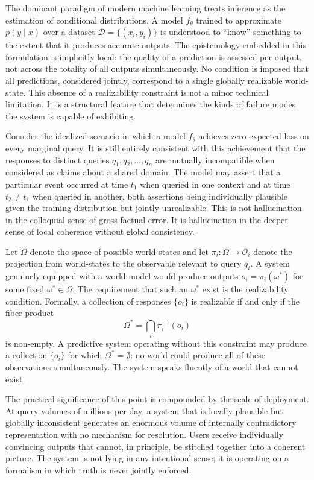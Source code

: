 \documentclass[12pt, oneside]{article}
\begin{document}
The dominant paradigm of modern machine learning treats inference as the estimation of conditional distributions. A model $f_\theta$ trained to approximate $p(y \mid x)$ over a dataset $\mathcal{D} = \{(x_i, y_i)\}$ is understood to ``know'' something to the extent that it produces accurate outputs. The epistemology embedded in this formulation is implicitly local: the quality of a prediction is assessed per output, not across the totality of all outputs simultaneously. No condition is imposed that all predictions, considered jointly, correspond to a single globally realizable world-state. This absence of a realizability constraint is not a minor technical limitation. It is a structural feature that determines the kinds of failure modes the system is capable of exhibiting.

Consider the idealized scenario in which a model $f_\theta$ achieves zero expected loss on every marginal query. It is still entirely consistent with this achievement that the responses to distinct queries $q_1, q_2, \ldots, q_n$ are mutually incompatible when considered as claims about a shared domain. The model may assert that a particular event occurred at time $t_1$ when queried in one context and at time $t_2 \neq t_1$ when queried in another, both assertions being individually plausible given the training distribution but jointly unrealizable. This is not hallucination in the colloquial sense of gross factual error. It is hallucination in the deeper sense of local coherence without global consistency.

Let $\Omega$ denote the space of possible world-states and let $\pi_i : \Omega \to \mathcal{O}_i$ denote the projection from world-states to the observable relevant to query $q_i$. A system genuinely equipped with a world-model would produce outputs $o_i = \pi_i(\omega^*)$ for some fixed $\omega^* \in \Omega$. The requirement that such an $\omega^*$ exist is the realizability condition. Formally, a collection of responses $\{o_i\}$ is realizable if and only if the fiber product
\begin{equation}
  \Omega^* = \bigcap_{i} \pi_i^{-1}(o_i)
\end{equation}
is non-empty. A predictive system operating without this constraint may produce a collection $\{o_i\}$ for which $\Omega^* = \emptyset$: no world could produce all of these observations simultaneously. The system speaks fluently of a world that cannot exist.

The practical significance of this point is compounded by the scale of deployment. At query volumes of millions per day, a system that is locally plausible but globally inconsistent generates an enormous volume of internally contradictory representation with no mechanism for resolution. Users receive individually convincing outputs that cannot, in principle, be stitched together into a coherent picture. The system is not lying in any intentional sense; it is operating on a formalism in which truth is never jointly enforced.
\end{document}
